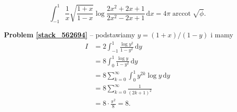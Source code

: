 %

\begin{problem_with_solution}[pytanie 562694]
    \label{stack_562694}%
    \begin{equation}
        \int_{-1}^1 \frac{1}{x} \sqrt{\frac{1+x}{1-x}} \log \frac{2x^2+2x+1}{2x^2-2x+1} \,\mathrm{d}x = 4 \pi \operatorname{arccot} \sqrt{\phi}.
    \end{equation}
\end{problem_with_solution}

\textbf{Problem \ref{stack_562694}} -- podstawiamy $y = (1+x) / (1-y)$ i mamy %
\begin{align} %
    I & = 2 \int_{-1}^1 \frac{\log y^2}{1-y^2} \,\mathrm{d}y \\ %
        & = 8 \int_0^1 \frac{\log y}{1-y^2} \, \mathrm{d}{y} \\ %
        & = 8 \sum_{k=0}^\infty \int_0^1 y^{2k} \log y \,\mathrm{d} y \\ %
        & = 8 \sum_{k=0}^\infty \frac{1}{(2k+1)^2} \\ %
        & = 8 \cdot \frac{\pi^2}{8} = 8. %
\end{align} %

%